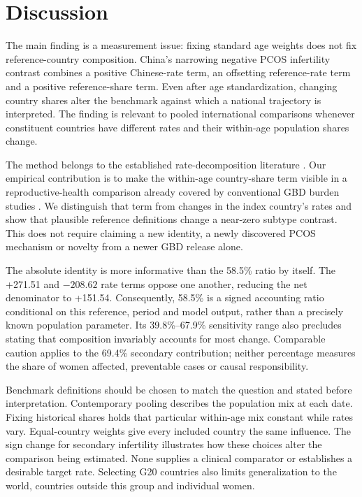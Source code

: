 \documentclass[11pt,a4paper]{article}
\begin{document}
\section{Discussion}
The main finding is a measurement issue: fixing standard age weights does not fix reference-country composition. China's narrowing negative PCOS infertility contrast combines a positive Chinese-rate term, an offsetting reference-rate term and a positive reference-share term. Even after age standardization, changing country shares alter the benchmark against which a national trajectory is interpreted. The finding is relevant to pooled international comparisons whenever constituent countries have different rates and their within-age population shares change.

The method belongs to the established rate-decomposition literature \cite{kitagawa}. Our empirical contribution is to make the within-age country-share term visible in a reproductive-health comparison already covered by conventional GBD burden studies \cite{liu_pcos2024,xu}. We distinguish that term from changes in the index country's rates and show that plausible reference definitions change a near-zero subtype contrast. This does not require claiming a new identity, a newly discovered PCOS mechanism or novelty from a newer GBD release alone.

The absolute identity is more informative than the 58.5\% ratio by itself. The +271.51 and $-208.62$ rate terms oppose one another, reducing the net denominator to +151.54. Consequently, 58.5\% is a signed accounting ratio conditional on this reference, period and model output, rather than a precisely known population parameter. Its 39.8\%--67.9\% sensitivity range also precludes stating that composition invariably accounts for most change. Comparable caution applies to the 69.4\% secondary contribution; neither percentage measures the share of women affected, preventable cases or causal responsibility.

Benchmark definitions should be chosen to match the question and stated before interpretation. Contemporary pooling describes the population mix at each date. Fixing historical shares holds that particular within-age mix constant while rates vary. Equal-country weights give every included country the same influence. The sign change for secondary infertility illustrates how these choices alter the comparison being estimated. None supplies a clinical comparator or establishes a desirable target rate. Selecting G20 countries also limits generalization to the world, countries outside this group and individual women.
\end{document}
